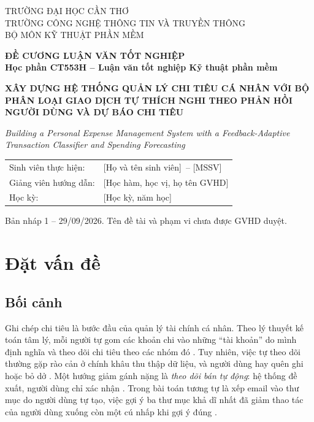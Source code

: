 \documentclass[12pt,a4paper]{article}
\newcommand{\sinhvien}{[Họ và tên sinh viên]}
\newcommand{\mssv}{[MSSV]}
\newcommand{\gvhd}{[Học hàm, học vị, họ tên GVHD]}
\newcommand{\hocky}{[Học kỳ, năm học]}
\newcommand{\donvi}{TRƯỜNG CÔNG NGHỆ THÔNG TIN VÀ TRUYỀN THÔNG} %
\newcommand{\bomon}{BỘ MÔN KỸ THUẬT PHẦN MỀM}
\begin{document}
\begin{titlepage}
\centering
{\large TRƯỜNG ĐẠI HỌC CẦN THƠ\\ \donvi\\ \bomon\par}
\vspace{3cm}
{\Large\bfseries ĐỀ CƯƠNG LUẬN VĂN TỐT NGHIỆP\\[4pt] Học phần CT553H -- Luận văn tốt nghiệp Kỹ thuật phần mềm\par}
\vspace{2cm}
{\LARGE\bfseries XÂY DỰNG HỆ THỐNG QUẢN LÝ CHI TIÊU CÁ NHÂN VỚI BỘ PHÂN LOẠI GIAO DỊCH TỰ THÍCH NGHI THEO PHẢN HỒI NGƯỜI DÙNG VÀ DỰ BÁO CHI TIÊU\par}
\vspace{0.8cm}
{\large\itshape\foreignlanguage{english}{Building a Personal Expense Management System with a Feedback-Adaptive Transaction Classifier and Spending Forecasting}\par}
\vfill
\begin{tabular}{ll}
Sinh viên thực hiện: & \sinhvien\ -- \mssv\\
Giảng viên hướng dẫn: & \gvhd\\
Học kỳ: & \hocky\\
\end{tabular}
\vspace{1.5cm}

{\small Bản nháp 1 -- 29/09/2026. Tên đề tài và phạm vi chưa được GVHD duyệt.\par}
\end{titlepage}

\tableofcontents
\newpage

\section{Đặt vấn đề}

\subsection{Bối cảnh}
Ghi chép chi tiêu là bước đầu của quản lý tài chính cá nhân. Theo lý thuyết kế toán tâm lý, mỗi người tự gom các khoản chi vào những ``tài khoản'' do mình định nghĩa và theo dõi chi tiêu theo các nhóm đó \citep{thaler1999mental,heath1996mental}. Tuy nhiên, việc tự theo dõi thường gặp rào cản ở chính khâu thu thập dữ liệu, và người dùng hay quên ghi hoặc bỏ dở \citep{li2010stage,epstein2015lived}. Một hướng giảm gánh nặng là \emph{theo dõi bán tự động}: hệ thống đề xuất, người dùng chỉ xác nhận \citep{choe2017semi}. Trong bài toán tương tự là xếp email vào thư mục do người dùng tự tạo, việc gợi ý ba thư mục khả dĩ nhất đã giảm thao tác của người dùng xuống còn một cú nhấp khi gợi ý đúng \citep{segal1999mailcat}.
\end{document}
